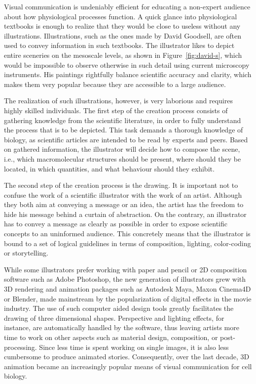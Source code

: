 Visual communication is undeniably efficient for educating a non-expert audience about how physiological processes function.
A quick glance into physiological textbooks is enough to realize that they would be close to useless without any illustrations.
Illustrations, such as the ones made by David Goodsell, are often used to convey information in such textbooks.
The illustrator likes to depict entire sceneries on the mesoscale levels, as shown in Figure~\ref{fig:david-s}, which would be impossible to observe otherwise in such detail using current microscopy instruments.
His paintings rightfully balance scientific accuracy and clarity, which makes them very popular because they are accessible to a large audience.

The realization of such illustrations, however, is very laborious and requires highly skilled individuals.
The first step of the creation process consists of gathering knowledge from the scientific literature, in order to fully understand the process that is to be depicted.
This task demands a thorough knowledge of biology, as scientific articles are intended to be read by experts and peers.
Based on gathered information, the illustrator will decide how to compose the scene, i.e., which macromolecular structures should be present, where should they be located, in which quantities, and what behaviour should they exhibit.

The second step of the creation process is the drawing. 
It is important not to confuse the work of a scientific illustrator with the work of an artist.
Although they both aim at conveying a message or an idea, the artist has the freedom to hide his message behind a curtain of abstraction.
On the contrary, an illustrator has to convey a message as clearly as possible in order to expose scientific concepts to an uninformed audience.
This concretely means that the illustrator is bound to a set of logical guidelines in terms of composition, lighting, color-coding or storytelling.

While some illustrators prefer working with paper and pencil or 2D composition software such as Adobe Photoshop, the new generation of illustrators grew with 3D rendering and animation packages such as Autodesk Maya, Maxon Cinema4D or Blender, made mainstream by the popularization of digital effects in the movie industry.
The use of such computer aided design tools greatly facilitates the drawing of three dimensional shapes.
Perspective and lighting effects, for instance, are automatically handled by the software, thus leaving artists more time to work on other aspects such as material design, composition, or post-processing.
Since less time is spent working on single images, it is also less cumbersome to produce animated stories. 
Consequently, over the last decade, 3D animation became an increasingly popular means of visual communication for cell biology.

